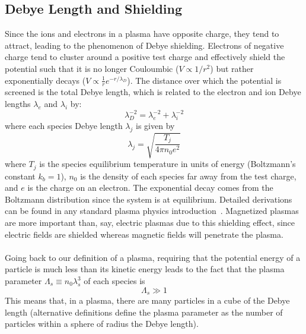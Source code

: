 \subsection{Debye Length and Shielding} \label{ssec:debye}
Since the ions and electrons in a plasma have opposite charge, they tend to attract, leading to the phenomenon of Debye shielding. Electrons of negative charge tend to cluster around a positive test charge and effectively shield the potential such that it is no longer Couloumbic ($V\propto1/r^2$) but rather exponentially decays ($V\propto\frac1r e^{-r/\lambda_D}$). The distance over which the potential is screened is the total Debye length, which is related to the electron and ion Debye lengths $\lambda_e$ and $\lambda_i$ by:
\begin{equation}
  \lambda_D^{-2}=\lambda_e^{-2}+\lambda_i^{-2} \label{eq:debye}
\end{equation}
where each species Debye length $\lambda_j$ is given by
\begin{equation}
  \lambda_j=\sqrt{\frac{T_j}{4\pi n_0 e^2}}
\end{equation}
where $T_j$ is the species equilibrium temperature in units of energy (Boltzmann's constant $k_b=1$), $n_0$ is the density of each species far away from the test charge, and $e$ is the charge on an electron. The exponential decay comes from the Boltzmann distribution since the system is at equilibrium. Detailed derivations can be found in any standard plasma physics introduction~\cite{Nicholson, Hazeltine, GurnettBhatt}. Magnetized plasmas are more important than, say, electric plasmas due to this shielding effect, since electric fields are shielded whereas magnetic fields will penetrate the plasma.\\
\\
Going back to our definition of a plasma, requiring that the potential energy of a particle is much less than its kinetic energy leads to the fact that the plasma parameter $\Lambda_s\equiv n_0\lambda_s^3$ of each species is
\begin{equation}
  \Lambda_s\gg1
\end{equation}
This means that, in a plasma, there are many particles in a cube of the Debye length (alternative definitions define the plasma parameter as the number of particles within a sphere of radius the Debye length). 

